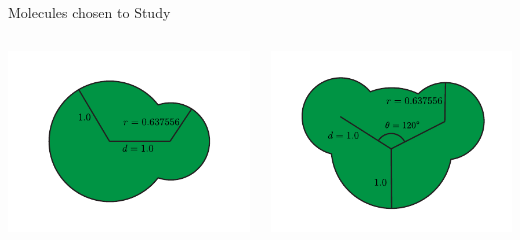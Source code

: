 \documentclass[16pt, aspectratio=43,compress]{beamer}
\begin{document}
\begin{frame}{Molecules chosen to Study}
    \begin{columns}
        \begin{column}{0.5\linewidth}
            \centering
            \includegraphics[width=\textwidth]{sone}\\
            \done
        \end{column}
        \begin{column}{0.5\linewidth}
            \centering
            \includegraphics[width=\textwidth]{tri}\\
            \tri
        \end{column}
    \end{columns}
\end{frame}
\end{document}
